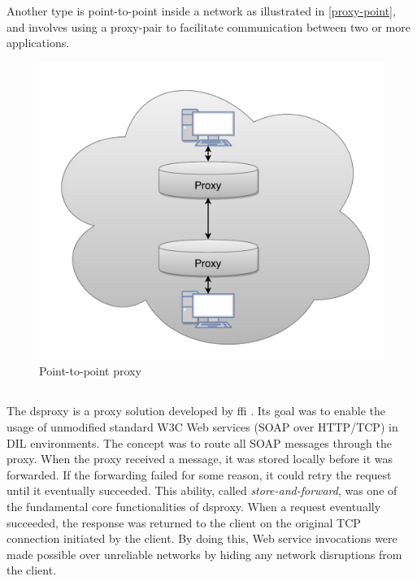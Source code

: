 Another type is point-to-point inside a network as illustrated in
\cref{proxy-point}, and involves using a proxy-pair to facilitate communication
between two or more applications.

\begin{figure}[h]
\includegraphics[scale=0.35]{images/proxy_point.pdf}
\caption{Point-to-point proxy}
\label{figure:proxy-point}
\end{figure}

\subsection{}

The \gls{dsproxy} is a proxy solution developed by \gls{ffi}
\cite{dsproxy-ffi}\cite{ieee-dsproxy}. Its goal was to enable the usage of
unmodified standard W3C Web services (SOAP over HTTP/TCP) in DIL environments.
The concept was to route all SOAP messages through the proxy. When the proxy
received a message, it was stored locally before it was forwarded. If the
forwarding failed for some reason, it could retry the request until it
eventually succeeded. This ability, called \textit{store-and-forward}, was one
of the fundamental core functionalities of \gls{dsproxy}. When a request
eventually succeeded, the response was returned to the client on the original
TCP connection initiated by the client. By doing this, Web service invocations
were made possible over unreliable networks by hiding any network disruptions
from the client.

